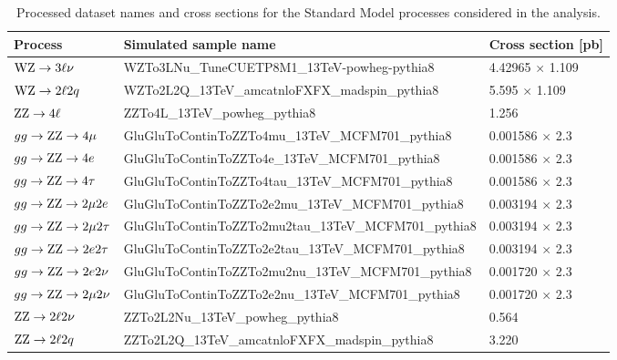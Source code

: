 \clearpage
\begin{table}
  \caption{Processed dataset names and cross sections for the Standard Model processes considered in the analysis.
\label{tab:mcprocess}}
    \begin{center}
    {\scriptsize
      \begin{tabular}{|p{3.0cm}|p{13cm}|p{3.5cm}|}
      \hline 
       \bf{Process} & \bf{Simulated sample name} & \bf{Cross section [pb]}\\
       \hline 
       $\mathrm{W}\mathrm{Z}\to 3\ell\nu$               & WZTo3LNu\_TuneCUETP8M1\_13TeV-powheg-pythia8 & 4.42965 $\times$ 1.109 \\ 
       $\mathrm{W}\mathrm{Z}\to 2\ell 2q$               & WZTo2L2Q\_13TeV\_amcatnloFXFX\_madspin\_pythia8 & 5.595 $\times$ 1.109 \\ 
       $\mathrm{Z}\mathrm{Z}\to 4\ell$                  & ZZTo4L\_13TeV\_powheg\_pythia8 & 1.256 \\ 
       $gg \to \mathrm{Z}\mathrm{Z} \to 4\mu$           & GluGluToContinToZZTo4mu\_13TeV\_MCFM701\_pythia8     & 0.001586 $\times$ 2.3  \\
       $gg \to \mathrm{Z}\mathrm{Z} \to 4e$             & GluGluToContinToZZTo4e\_13TeV\_MCFM701\_pythia8      & 0.001586 $\times$ 2.3  \\
       $gg \to \mathrm{Z}\mathrm{Z} \to 4\tau$          & GluGluToContinToZZTo4tau\_13TeV\_MCFM701\_pythia8    & 0.001586 $\times$ 2.3  \\
       $gg \to \mathrm{Z}\mathrm{Z} \to 2\mu 2e$        & GluGluToContinToZZTo2e2mu\_13TeV\_MCFM701\_pythia8   & 0.003194 $\times$ 2.3  \\
       $gg \to \mathrm{Z}\mathrm{Z} \to 2\mu 2\tau$     & GluGluToContinToZZTo2mu2tau\_13TeV\_MCFM701\_pythia8 & 0.003194 $\times$ 2.3  \\
       $gg \to \mathrm{Z}\mathrm{Z} \to 2e 2\tau$       & GluGluToContinToZZTo2e2tau\_13TeV\_MCFM701\_pythia8  & 0.003194 $\times$ 2.3  \\
       $gg \to \mathrm{Z}\mathrm{Z} \to 2e 2\nu$        & GluGluToContinToZZTo2mu2nu\_13TeV\_MCFM701\_pythia8  & 0.001720 $\times$ 2.3  \\
       $gg \to \mathrm{Z}\mathrm{Z} \to 2\mu 2\nu$       & GluGluToContinToZZTo2e2nu\_13TeV\_MCFM701\_pythia8   & 0.001720 $\times$ 2.3  \\
       $\mathrm{Z}\mathrm{Z}\to 2\ell 2\nu$             & ZZTo2L2Nu\_13TeV\_powheg\_pythia8 & 0.564 \\ 
       $\mathrm{Z}\mathrm{Z}\to 2\ell 2q$               & ZZTo2L2Q\_13TeV\_amcatnloFXFX\_madspin\_pythia8 & 3.220 \\ 

\end{tabular}}
\end{center}
\end{table}
